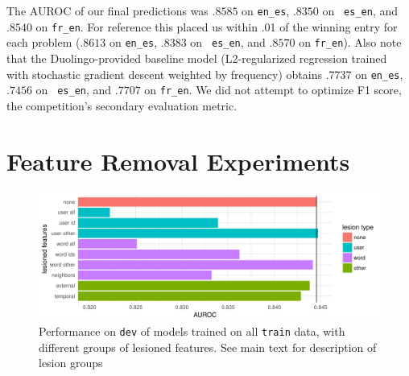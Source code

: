 \documentclass[11pt,a4paper]{article}
\begin{document}
The AUROC of our final predictions was $.8585$ on {\tt en\_es}, $.8350$ on {\tt
  es\_en}, and $.8540$ on {\tt fr\_en}. For reference this placed us within .01 of the winning
  entry for each problem ($.8613$ on {\tt en\_es}, $.8383$ on {\tt
  es\_en}, and $.8570$ on {\tt fr\_en}).  Also note that the Duolingo-provided baseline
  model (L2-regularized regression trained with stochastic gradient descent weighted
  by frequency) obtains $.7737$ on {\tt en\_es}, $.7456$ on {\tt
  es\_en}, and $.7707$ on {\tt fr\_en}.
We did not attempt to optimize F1 score, the competition's secondary evaluation metric.

\section{Feature Removal Experiments}

\begin{figure}[htp]
\includegraphics[width=\textwidth]{lesions.pdf}
\caption{Performance on {\tt dev} of models trained on all {\tt train} data,
  with different groups of lesioned features. See main text for description of
  lesion groups}
\label{fig:lesions}
\end{figure}
\end{document}
